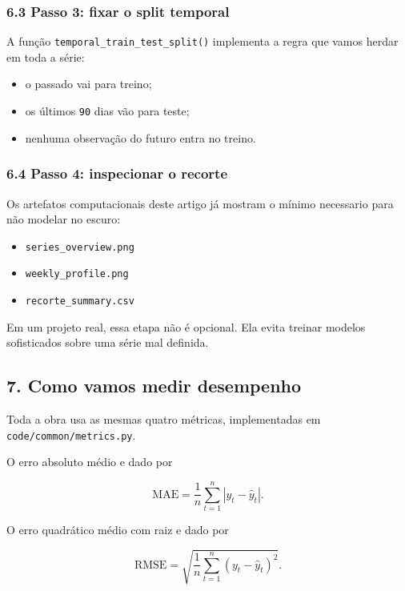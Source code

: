 \documentclass[12pt]{article}
\providecommand{\tightlist}{%
  \setlength{\itemsep}{0pt}\setlength{\parskip}{0pt}}
\begin{document}
\subsubsection{6.3 Passo 3: fixar o split temporal}\label{63-passo-3-fixar-o-split-temporal}

A função \texttt{temporal\_train\_test\_split()} implementa a regra que vamos herdar em toda a série:

\begin{itemize}
\tightlist
\item
  o passado vai para treino;
\item
  os últimos \texttt{90} dias vão para teste;
\item
  nenhuma observação do futuro entra no treino.
\end{itemize}

\subsubsection{6.4 Passo 4: inspecionar o recorte}\label{64-passo-4-inspecionar-o-recorte}

Os artefatos computacionais deste artigo já mostram o mínimo necessario para não modelar no escuro:

\begin{itemize}
\tightlist
\item
  \texttt{series\_overview.png}
\item
  \texttt{weekly\_profile.png}
\item
  \texttt{recorte\_summary.csv}
\end{itemize}

Em um projeto real, essa etapa não é opcional. Ela evita treinar modelos sofisticados sobre uma série mal definida.

\subsection{7. Como vamos medir desempenho}\label{7-como-vamos-medir-desempenho}

Toda a obra usa as mesmas quatro métricas, implementadas em \texttt{code/common/metrics.py}.

O erro absoluto médio e dado por

\[
\mathrm{MAE} = \frac{1}{n} \sum_{t=1}^n |y_t - \hat{y}_t|.
\]

O erro quadrático médio com raiz e dado por

\[
\mathrm{RMSE} = \sqrt{\frac{1}{n} \sum_{t=1}^n (y_t - \hat{y}_t)^2}.
\]
\end{document}
